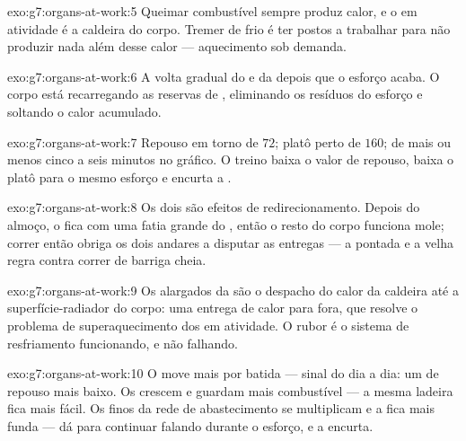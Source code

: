\begin{solution}{exo:g7:organs-at-work:5}
Queimar combustível sempre produz calor, e o  em atividade é a
caldeira do corpo. Tremer de frio é ter  postos a trabalhar
para não produzir nada além desse calor --- aquecimento sob demanda.
\end{solution}

\begin{solution}{exo:g7:organs-at-work:6}
A volta gradual do  e da  depois que o esforço acaba. O
corpo está recarregando as reservas de , eliminando os
resíduos do esforço e soltando o calor acumulado.
\end{solution}

\begin{solution}{exo:g7:organs-at-work:7}
Repouso em torno de $72$; platô perto de $160$;  de mais ou
menos cinco a seis minutos no gráfico. O treino baixa o valor de
repouso, baixa o platô para o mesmo esforço e encurta a .
\end{solution}

\begin{solution}{exo:g7:organs-at-work:8}
Os dois são efeitos de redirecionamento. Depois do almoço, o  fica com uma fatia grande do , então o resto do corpo
funciona mole; correr então obriga os dois andares a disputar as
entregas --- a pontada e a velha regra contra correr de barriga cheia.
\end{solution}

\begin{solution}{exo:g7:organs-at-work:9}
Os  alargados da  são o despacho do calor da caldeira até a
superfície-radiador do corpo: uma entrega de calor para fora, que
resolve o problema de superaquecimento dos  em atividade. O
rubor é o sistema de resfriamento funcionando, e não falhando.
\end{solution}

\begin{solution}{exo:g7:organs-at-work:10}
O  move mais  por batida --- sinal do dia a dia: um 
de repouso mais baixo. Os  crescem e guardam mais combustível
--- a mesma ladeira fica mais fácil. Os  finos da rede de
abastecimento se multiplicam e a  fica mais funda --- dá para
continuar falando durante o esforço, e a  encurta.
\end{solution}

